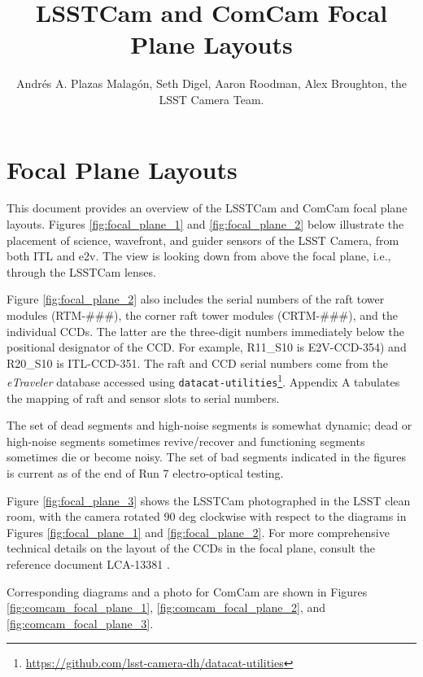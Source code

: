 \documentclass[OPS,authoryear,toc]{lsstdoc}
\title{LSSTCam and ComCam Focal Plane Layouts}
\author{%
Andrés A. Plazas Malagón, Seth Digel, Aaron Roodman, Alex Broughton, the LSST Camera Team. 
}
\date{\vcsDate}
\begin{document}
\maketitle


\section{Focal Plane Layouts}
This document provides an overview of the LSSTCam and ComCam focal plane layouts.
Figures \ref{fig:focal_plane_1} and \ref{fig:focal_plane_2} below illustrate the placement of science, wavefront, and guider sensors of the LSST Camera, from both ITL and e2v.
The view is looking down from above the focal plane, i.e., through the LSSTCam lenses.

Figure \ref{fig:focal_plane_2} also includes the serial numbers of the raft tower modules (RTM-\#\#\#), the corner raft tower modules (CRTM-\#\#\#), and the individual CCDs.
The latter are the three-digit numbers immediately below the positional designator of the CCD.
For example, R11\_S10 is E2V-CCD-354) and R20\_S10 is ITL-CCD-351.
The raft and CCD serial numbers come from the \emph{eTraveler} database accessed using {\tt{datacat-utilities}}\footnote{\url{https://github.com/lsst-camera-dh/datacat-utilities}}.
Appendix A tabulates the mapping of raft and sensor slots to serial numbers.

The set of dead segments and high-noise segments is somewhat dynamic; dead or high-noise segments sometimes revive/recover and functioning segments sometimes die or become noisy.
The set of bad segments indicated in the figures is current as of the end of Run 7 electro-optical testing.

Figure \ref{fig:focal_plane_3} shows the LSSTCam photographed in the LSST clean room, with the camera rotated 90 deg clockwise with respect to the diagrams in Figures \ref{fig:focal_plane_1} and \ref{fig:focal_plane_2}.
For more comprehensive technical details on the layout of the CCDs in the focal plane, consult the reference document LCA-13381 \citep{lca13381}. 

Corresponding diagrams and a photo for ComCam are shown in Figures \ref{fig:comcam_focal_plane_1}, \ref{fig:comcam_focal_plane_2}, and \ref{fig:comcam_focal_plane_3}. 
\end{document}
